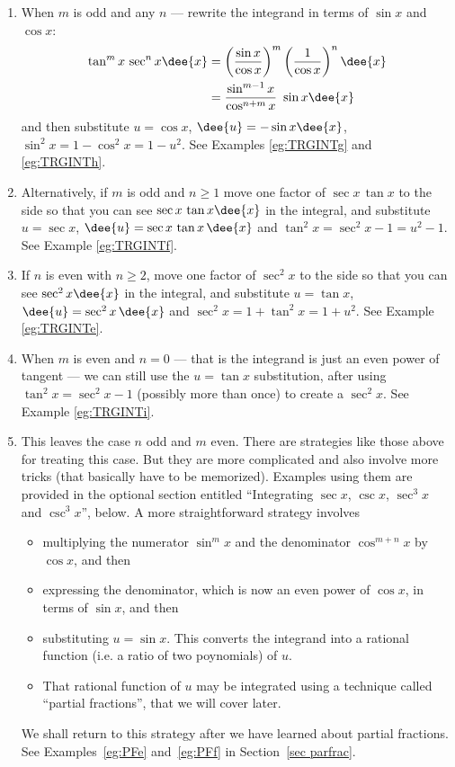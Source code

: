 \begin{enumerate}[(1)]
 \item When $m$ is odd and any $n$ --- rewrite the integrand in terms of $\sin
x$ and $\cos x$:
\begin{align*}
\tan^m x\,\sec^n x\dee{x}
       &=\left(\frac{\sin x}{\cos x}\right)^m 
         \left(\frac{1}{\cos x}\right)^n\dee{x}\\
       &=\frac{\sin^{m-1}x}{\cos^{n+m}x}\ \sin x\dee{x}
\end{align*}
and then substitute $u=\cos x$, $\dee{u} = -\sin x\dee{x}$, $\sin^2x = 1-\cos^2x=1-u^2$. See
Examples \ref{eg:TRGINTg} and \ref{eg:TRGINTh}.
 \item Alternatively, if $m$ is odd and $n \geq 1$ move one factor of
$\sec x\,\tan x$ to the side so that you can see $\sec x\,\tan x\dee{x}$
in the integral, and substitute $u=\sec x$, $\dee{u}=\sec x\,\tan x\,\dee{x}$
and $\tan^2 x = \sec^2 x-1=u^2-1$. See Example \ref{eg:TRGINTf}.

\item
If $n$ is even with $n\ge 2$, move one factor of $\sec^2 x$ to
the side so that you can see $\sec^2 x\dee{x}$ in the integral, and
substitute $u=\tan x$, $\dee{u}=\sec^2 x\,\dee{x}$ and $\sec^2 x = 1+\tan^2 x=1+u^2$.
See Example \ref{eg:TRGINTe}.

\item When $m$ is even and $n=0$ --- that is the integrand is just an even power of
tangent --- we can still use the $u=\tan x$ substitution,
after using $\tan^2x = \sec^2 x - 1$ (possibly more than once) to
create a $\sec^2 x$. See Example \ref{eg:TRGINTi}.

\item This leaves the case $n$ odd and $m$ even.
There are strategies like those above for treating this case. But
they are more complicated and also involve more tricks (that basically
have to be memorized). Examples using
them are provided in the optional section entitled
``Integrating $\sec x$, $\csc x$, $\sec^3 x$ and $\csc^3 x$'', below.
A more straightforward strategy involves
\begin{itemize}\itemsep1pt \parskip0pt  %
\item multiplying the numerator $\sin^m x$ and the denominator $\cos^{m+n}x$
      by $\cos x$, and then
\item expressing the denominator, which is now an even power of $\cos x$, in terms of $\sin x$, and then
\item substituting $u=\sin x$. This converts the integrand into a rational function (i.e. a ratio of two poynomials) of $u$. 
\item That rational function of $u$ may be integrated using a technique called ``partial fractions'', that we will cover later.
\end{itemize}
We shall return to this strategy after we
have learned about partial fractions. See Examples~\ref{eg:PFe} and~\ref{eg:PFf} in
Section~\ref{sec parfrac}.
\end{enumerate}

